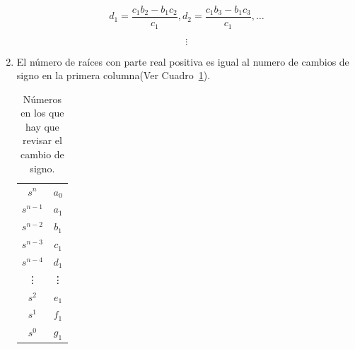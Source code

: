 \begin{enumerate}
            \begin{equation*}
            d_1 = \frac{c_1 b_2 - b_1 c_2}{c_1} , d_2 = \frac{c_1 b_3 - b_1 c_3}{c_1} , \dots
            \end{equation*}

            \begin{equation*}
            \vdots
            \end{equation*}

            \item El número de raíces con parte real positiva es igual al numero de cambios de signo en la primera columna(Ver Cuadro~\ref{tab:Numeros}).

            \begin{table}[htbp]
                \centering
                \begin{tabular}{c|c|}
                $s^n$     & $a_0$ \\
                $s^{n-1}$ & $a_1$ \\
                $s^{n-2}$ & $b_1$ \\
                $s^{n-3}$ & $c_1$ \\
                $s^{n-4}$ & $d_1$ \\
                \vdots & \vdots   \\
                $s^2$ & $e_1$     \\
                $s^1$ & $f_1$     \\
                $s^0$ & $g_1$
                \end{tabular}
            \caption{\label{tab:Numeros}Números en los que hay que revisar el cambio de signo.}
            \end{table}

        \end{enumerate}


    \newpage
